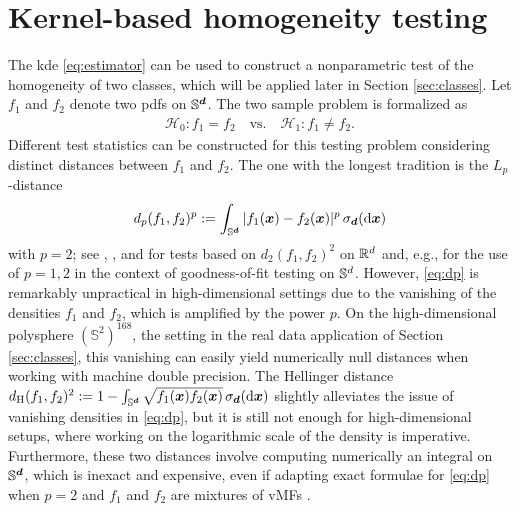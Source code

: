 \documentclass[oneside,11pt]{article}
\begin{document}
\section{Kernel-based homogeneity testing}
\label{sec:hom}

The kde \eqref{eq:estimator} can be used to construct a nonparametric test of the homogeneity of two classes, which will be applied later in Section \ref{sec:classes}. Let $f_1$ and $f_2$ denote two pdfs on $\mathbb{S}^{\boldsymbol{d}}$. The two sample problem is formalized as
\begin{align}
    \mathcal{H}_0:f_1=f_2 \quad\text{vs.} \quad \mathcal{H}_1:f_1\neq f_2.\label{eq:twosamp}
\end{align}
Different test statistics can be constructed for this testing problem considering distinct distances between $f_1$ and $f_2$. The one with the longest tradition is the $L_p$-distance
\begin{align}
    d_p(f_1,f_2)^p:= \int_{\mathbb{S}^{\boldsymbol{d}}}|f_1(\boldsymbol{x})-f_2(\boldsymbol{x})|^p\,\sigma_{\boldsymbol{d}}(\mathrm{d}\boldsymbol{x})\label{eq:dp}
\end{align}
with $p=2$; see \citet[Chapter 3]{Mammen1992}, \cite{Anderson1994a}, and \cite{Li1996} for tests based on $d_2(f_1,f_2)^2$ on $\mathbb{R}^d$ and, e.g., \cite{Boente2014} for the use of $p=1,2$ in the context of goodness-of-fit testing on $\mathbb{S}^{d}$. However, \eqref{eq:dp} is remarkably unpractical in high-dimensional settings due to the vanishing of the densities $f_1$ and $f_2$, which is amplified by the power $p$. On the high-dimensional polysphere $(\mathbb{S}^2)^{168}$, the setting in the real data application of Section \ref{sec:classes}, this vanishing can easily yield numerically null distances when working with machine double precision. The Hellinger distance $d_\mathrm{H}(f_1,f_2)^2:= 1-\int_{\mathbb{S}^{\boldsymbol{d}}}\sqrt{f_1(\boldsymbol{x}) f_2(\boldsymbol{x})}\,\sigma_{\boldsymbol{d}}(\mathrm{d}\boldsymbol{x})$ slightly alleviates the issue of vanishing densities in \eqref{eq:dp}, but it is still not enough for high-dimensional setups, where working on the logarithmic scale of the density is imperative. Furthermore, these two distances involve computing numerically an integral on $\mathbb{S}^{\boldsymbol{d}}$, which is inexact and expensive, even if adapting exact formulae for \eqref{eq:dp} when $p=2$ and $f_1$ and $f_2$ are mixtures of vMFs \citep[Proposition~4]{Garcia-Portugues2013b}.
\end{document}
